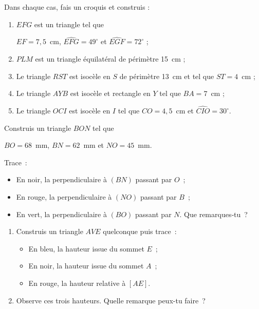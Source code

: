 \begin{exercice}
Dans chaque cas, fais un croquis et construis :
 \begin{enumerate}
  \item $EFG$ est un triangle tel que 
  
  $EF = 7,5$ cm, $\widehat{EFG} = 49^\circ$ et $\widehat{EGF} = 72^\circ$ ;
  \item $PLM$ est un triangle équilatéral de périmètre 15 cm ;
  \item Le triangle $RST$ est isocèle en $S$ de périmètre 13 cm et tel que $ST = 4$ cm ;
  \item Le triangle $AYB$ est isocèle et rectangle en $Y$ tel que $BA = 7$ cm ;
  \item Le triangle $OCI$ est isocèle en $I$ tel que $CO = 4,5$ cm et $\widehat{CIO} = 30^\circ$.
  \end{enumerate}
\end{exercice}




\begin{exercice}
Construis un triangle $BON$ tel que 

$BO = 68$ mm, $BN = 62$ mm et $NO = 45$ mm.

Trace :
\begin{itemize}
 \item En noir, la perpendiculaire à $(BN)$ passant par $O$ ;
 \item En rouge, la perpendiculaire à $(NO)$ passant par $B$ ;
 \item En vert, la perpendiculaire à $(BO)$ passant par $N$. Que remarques‑tu ?
 \end{itemize}
\end{exercice}


\begin{exercice}
\begin{enumerate}
 \item Construis un triangle $AVE$ quelconque puis trace :
 \begin{itemize}
  \item En bleu, la hauteur issue du sommet $E$ ;
  \item En noir, la hauteur issue du sommet $A$ ;
  \item En rouge, la hauteur relative à $[AE]$.
  \end{itemize}
 \item Observe ces trois hauteurs. Quelle remarque peux-tu faire ?
 \end{enumerate}
\end{exercice}


